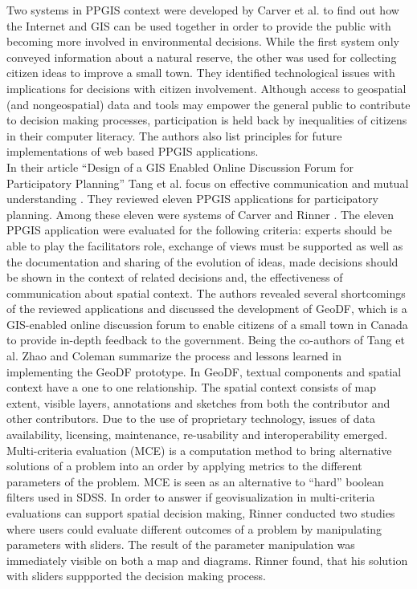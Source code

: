 Two systems in PPGIS context were developed by Carver et al. \cite{Carver2001_PPGIS_Cyberdemocracy} to find out how the Internet and GIS can be used together in order to provide the public with becoming more involved in environmental decisions. While the first system only conveyed information about a natural reserve, the other was used for collecting citizen ideas to improve a small town. They identified technological issues with implications for decisions with citizen involvement. Although access to geospatial (and nongeospatial) data and tools may empower the general public to contribute to decision making processes, participation is held back by inequalities of citizens in their computer literacy. The authors also list principles for future implementations of web based PPGIS applications.\\
In their article ``Design of a GIS Enabled Online Discussion Forum for Participatory Planning'' Tang et al. focus on effective communication and mutual understanding \cite{Tang2005_PPGIS_discussion_forum}. They reviewed eleven PPGIS applications for participatory planning. Among these eleven were systems of Carver \cite{Carver2001_PPGIS_Cyberdemocracy} and Rinner \cite{Rinner_ArgumentationMaps,Kessler2005_ArgumentationMapPrototype}. The eleven PPGIS application were evaluated for the following criteria: experts should be able to play the facilitators role, exchange of views must be supported as well as the documentation and sharing of the evolution of ideas, made decisions should be shown in the context of related decisions and, the effectiveness of communication about spatial context. The authors revealed several shortcomings of the reviewed applications and discussed the development of GeoDF, which is a GIS-enabled online discussion forum to enable citizens of a small town in Canada to provide in-depth feedback to the government. Being the co-authors of Tang et al. \cite{Tang2005_PPGIS_discussion_forum} Zhao and Coleman \cite{zhao2006geodf} summarize the process and lessons learned in implementing the GeoDF prototype. In GeoDF, textual components and spatial context have a one to one relationship. The spatial context consists of map extent, visible layers, annotations and sketches from both the contributor and other contributors. Due to the use of proprietary technology, issues of data availability, licensing, maintenance, re-usability and interoperability emerged.\\
Multi-criteria evaluation (MCE) is a computation method to bring alternative solutions of a problem into an order by applying metrics to the different parameters of the problem. MCE is seen as an alternative to ``hard'' boolean filters used in SDSS. In order to answer if geovisualization in multi-criteria evaluations can support spatial decision making, Rinner \cite{Rinner2007_geovis_decisionsupport} conducted two studies where users could evaluate different outcomes of a problem by manipulating parameters with sliders. The result of the parameter manipulation was immediately visible on both a map and diagrams. Rinner found, that his solution with sliders suppported the decision making process.\\
